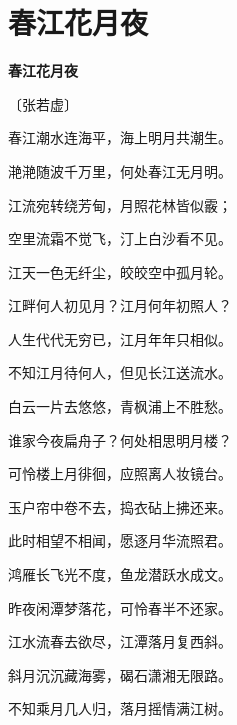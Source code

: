 \documentclass[12pt,UTF-8,openany,fontset=none]{ctexbook}
\begin{document}
\vspace{8pt}
\clearpage

\section{春江花月夜}


\begin{center}
    {\bfseries 春江花月夜}

    \vspace{18pt}

    \begin{large}\xuwen
        〔张若虚〕
    \end{large}

\end{center}

    \vspace{10pt}  %

\begin{center}
    \begin{Large}

        春江潮水连海平，海上明月共潮生。

        滟滟随波千万里，何处春江无月明。

        江流宛转绕芳甸，月照花林皆似霰；

        空里流霜不觉飞，汀上白沙看不见。

        江天一色无纤尘，皎皎空中孤月轮。

        江畔何人初见月？江月何年初照人？

        人生代代无穷已，江月年年只相似。

        不知江月待何人，但见长江送流水。

        白云一片去悠悠，青枫浦上不胜愁。

        谁家今夜扁舟子？何处相思明月楼？

        可怜楼上月徘徊，应照离人妆镜台。

        玉户帘中卷不去，捣衣砧上拂还来。

        此时相望不相闻，愿逐月华流照君。

        鸿雁长飞光不度，鱼龙潜跃水成文。

        昨夜闲潭梦落花，可怜春半不还家。

        江水流春去欲尽，江潭落月复西斜。

        斜月沉沉藏海雾，碣石潇湘无限路。

        不知乘月几人归，落月摇情满江树。

    \end{Large}

\end{center}
\end{document}
